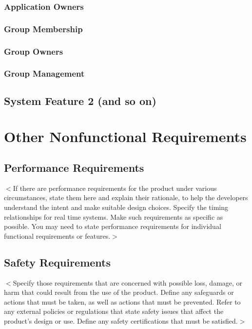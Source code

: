 \documentclass{scrreprt}
\begin{document}
\subsection{Application Owners}
\label{sec:application-owners}

\subsection{Group Membership}
\label{sec:group-membership}

\subsection{Group Owners}
\label{sec:group-owners}

\subsection{Group Management}
\label{sec:group-management}




\section{System Feature 2 (and so on)}

\begin{reqmt}
  \label{req:fenetre-sur-cour}
\end{reqmt}

\chapter{Other Nonfunctional Requirements}

\section{Performance Requirements}
$<$If there are performance requirements for the product under various 
circumstances, state them here and explain their rationale, to help the 
developers understand the intent and make suitable design choices. Specify the 
timing relationships for real time systems. Make such requirements as specific 
as possible. You may need to state performance requirements for individual 
functional requirements or features.$>$


\section{Safety Requirements}
$<$Specify those requirements that are concerned with possible loss, damage, or 
harm that could result from the use of the product. Define any safeguards or 
actions that must be taken, as well as actions that must be prevented. Refer to 
any external policies or regulations that state safety issues that affect the 
product’s design or use. Define any safety certifications that must be 
satisfied.$>$
\end{document}

